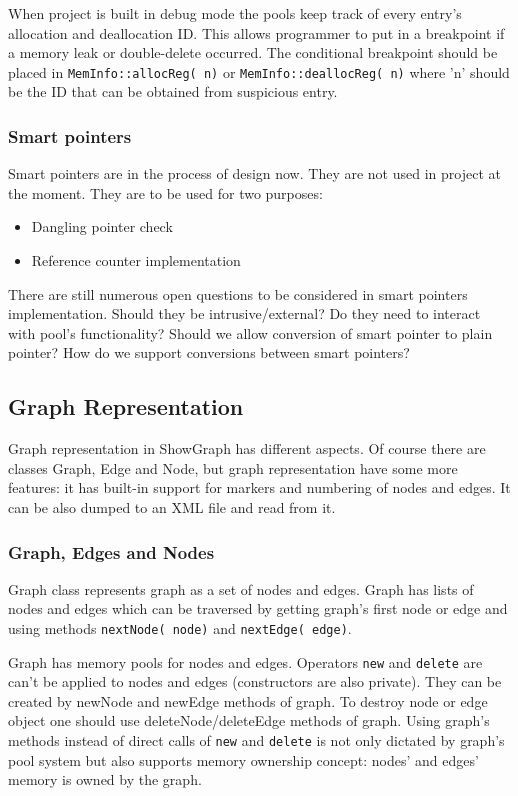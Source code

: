 \documentclass[11pt,twoside,a4paper]{article}
\begin{document}
When project is built in debug mode the pools keep track of every entry's allocation and deallocation ID. This allows programmer to put in a breakpoint if a memory leak or double-delete occurred. The conditional breakpoint should be placed in \lstinline{MemInfo::allocReg( n)} or \lstinline{MemInfo::deallocReg( n)} where 'n' should be the ID that can be obtained from suspicious entry.

\subsubsection{Smart pointers}
Smart pointers are in the process of design now. They are not used in project at the moment. They are to be used for two purposes:
\begin{itemize}
\item Dangling pointer check
\item Reference counter implementation
\end{itemize}

There are still numerous open questions to be considered in smart pointers implementation. Should they be intrusive/external? Do they need to interact with pool's functionality? Should we allow conversion of smart pointer to plain pointer? How do we support conversions between smart pointers?

\subsection{Graph Representation}
Graph representation in ShowGraph has different aspects. Of course there are classes Graph, Edge and Node, but graph representation have some more features: it has built-in support for markers and numbering of nodes and edges. It can be also dumped to an XML file and read from it.

\subsubsection{Graph, Edges and Nodes}
Graph class represents graph as a set of nodes and edges. Graph has lists of nodes and edges which can be traversed by getting graph's first node or edge and using methods \lstinline{nextNode( node)} and \lstinline{nextEdge( edge)}. 

Graph has memory pools for nodes and edges. Operators \lstinline{new} and \lstinline{delete} are can't be applied to nodes and edges (constructors are also private).  They can be created by newNode and newEdge methods of graph. To destroy node or edge object one should use deleteNode/deleteEdge methods of graph. Using graph's methods instead of direct calls of \lstinline{new} and \lstinline{delete} is not only dictated by graph's pool system but also supports memory ownership concept: nodes' and edges' memory is owned by the graph.
\end{document}
